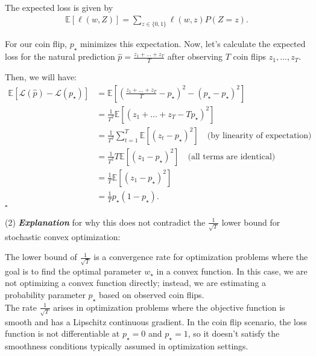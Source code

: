 \documentclass[letterpaper]{article}
\renewcommand{\L}{\mathcal{L}}
\renewcommand{\qedsymbol}{\hfill $\square$}
\begin{document}
\begin{enumerate}
    The expected loss is given by
    \begin{equation}
    	\begin{aligned}
    		\mathbb{E}[\ell(w, Z)] = \sum_{z \in \{0, 1\}} \ell(w, z) P(Z = z).
    	\end{aligned}
    \end{equation}
    
    For our coin flip, \(p_\star\) minimizes this expectation. Now, let's calculate the expected loss for the natural prediction \(\hat{p} = \frac{z_1 + \dots + z_T}{T}\) after observing \(T\) coin flips \(z_1, \dots, z_T\).
    
    Then, we will have:
    \begin{equation}
    	\begin{aligned}
    		\mathbb{E}[\L(\hat{p}) - \L(p_\star)] &= \mathbb{E}\left[\left(\frac{z_1 + \dots + z_T}{T} - p_\star\right)^2 - (p_\star - p_\star)^2\right] \\
    		&= \frac{1}{T^2}\mathbb{E}\left[(z_1 + \dots + z_T - Tp_\star)^2\right] \\
    		&= \frac{1}{T^2}\sum_{t=1}^T\mathbb{E}\left[(z_t - p_\star)^2\right] \quad \text{(by linearity of expectation)} \\
    		&= \frac{1}{T^2}T\mathbb{E}\left[(z_1 - p_\star)^2\right] \quad \text{(all terms are identical)} \\
    		&= \frac{1}{T}\mathbb{E}\left[(z_1 - p_\star)^2\right] \\
    		&= \frac{1}{T} p_\star(1-p_\star).
    	\end{aligned}
    \end{equation}
    \qedsymbol
    
    (2) \textbf{\textit{Explanation}} for why this does not contradict the \(\frac{1}{\sqrt{T}}\) lower bound for stochastic convex optimization:
    
    The lower bound of \(\frac{1}{\sqrt{T}}\) is a convergence rate for optimization problems where the goal is to find the optimal parameter \(w_\star\) in a convex function. In this case, we are not optimizing a convex function directly; instead, we are estimating a probability parameter \(p_\star\) based on observed coin flips.\\
    
    The rate \(\frac{1}{\sqrt{T}}\) arises in optimization problems where the objective function is smooth and has a Lipschitz continuous gradient. In the coin flip scenario, the loss function is not differentiable at \(p_\star = 0\) and \(p_\star = 1\), so it doesn't satisfy the smoothness conditions typically assumed in optimization settings.
    
    
\end{enumerate}
\end{document}
